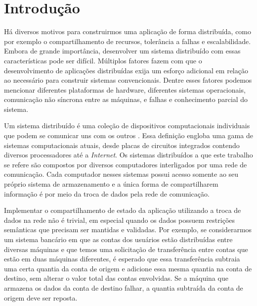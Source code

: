\documentclass[11pt,twoside,a4paper]{book}
\begin{document}
\listoffigures
\listofalgorithms

\mainmatter

\fancyhead[RE,LO]{\thesection}

\singlespacing              %

\chapter{Introdução}
\label{chap:introducao}
Há diversos motivos para construirmos uma aplicação de forma distribuída, como por exemplo o compartilhamento de recursos, tolerância a falhas e 
escalabilidade. Embora de grande importância, desenvolver um sistema distribuído com essas características pode ser difícil. Múltiplos fatores 
fazem com que o desenvolvimento de aplicações distribuídas exija um esforço adicional em relação ao necessário para construir sistemas 
convencionais. Dentre esses fatores podemos mencionar diferentes plataformas de hardware, diferentes sistemas operacionais, comunicação não 
síncrona entre as máquinas, e falhas e conhecimento parcial do sistema.

Um sistema distribuído é uma coleção de dispositivos computacionais individuais que podem se comunicar uns com os outros 
\cite{tanenbaum, distributed_computing}. Essa definição engloba uma gama de
sistemas computacionais atuais, desde placas de circuitos integrados contendo diversos processadores até a \emph{Internet}. Os sistemas 
distribuídos a que este trabalho se refere são compostos por diversos computadores interligados por uma rede de comunicação. Cada computador 
nesses sistemas possui acesso somente ao seu próprio sistema de armazenamento e a única forma de compartilharem informação é por meio da troca 
de dados pela rede de comunicação.

Implementar o compartilhamento de estado da aplicação utilizando a troca de
dados na rede não é trivial, em especial quando os dados possuem restrições semânticas que precisam ser mantidas e validadas. Por exemplo, se 
considerarmos um sistema bancário em que as contas dos usuários estão
distribuídas entre diversas máquinas e que temos uma solicitação de transferência entre contas que estão em duas máquinas diferentes, é esperado 
que essa transferência subtraia uma certa quantia da conta de origem e adicione essa mesma quantia na conta de destino, sem alterar o valor 
total das contas envolvidas. Se a máquina que armazena os dados da conta de
destino falhar, a quantia subtraída da conta de origem deve ser reposta.
\end{document}
